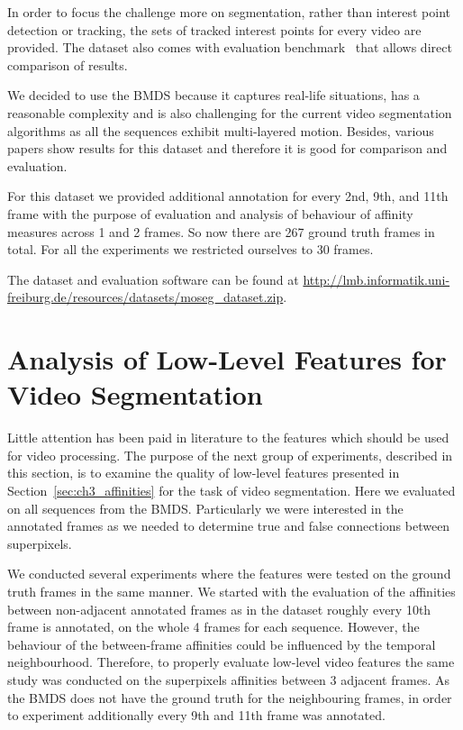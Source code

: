 In order to focus the challenge more on segmentation, rather than interest point detection or tracking, the sets of tracked interest points for every video are provided. The dataset also comes with evaluation 
benchmark~\cite{Galasso13} that allows direct comparison of results. 

We decided to use the BMDS because it captures real-life situations, has a reasonable complexity and is also challenging for the current video segmentation algorithms as all the sequences exhibit multi-layered
motion. Besides, various papers show results for this dataset and therefore it is good for comparison and evaluation.

For this dataset we provided additional annotation for every 2nd, 9th, and 11th frame with the purpose of evaluation and analysis of behaviour of affinity measures across 1 and 2 frames. 
So now there are 267 ground truth frames in total.
For all the experiments we restricted ourselves to 30 frames.

The dataset and evaluation software can be found at \url{http://lmb.informatik.uni-freiburg.de/resources/datasets/moseg_dataset.zip}.
\section{Analysis of Low-Level Features for Video Segmentation}
\label{sec:ch3_aff}
Little attention has been paid in literature to the features which should be used for video processing.
The purpose of the next group of experiments, described in this section, is to examine the quality of low-level features presented in Section~\ref{sec:ch3_affinities} for the task of video segmentation.
Here we evaluated on all sequences from the BMDS. Particularly we were interested in the annotated frames as we needed to determine true and false connections between superpixels.

We conducted several experiments where the features were tested on the ground truth frames in the same manner. We started with the evaluation of the affinities between non-adjacent annotated frames as 
in the dataset roughly every 10th frame is annotated, on the whole 4 frames for each sequence.
However, the behaviour of the between-frame affinities could be influenced by the temporal neighbourhood. Therefore, to properly evaluate low-level video features the same study was
conducted on the superpixels affinities between 3 adjacent frames. As the BMDS does not have the ground truth for the neighbouring frames, in order to experiment
additionally every 9th and 11th frame was annotated.
